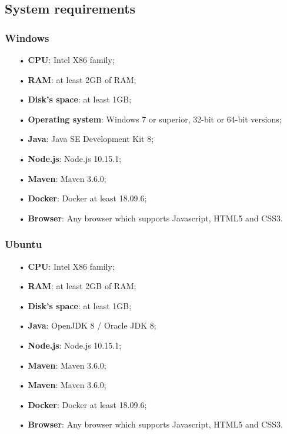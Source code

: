 \subsection{System requirements}
\subsubsection{Windows}
\begin{itemize}
\item [•]\textbf{CPU}: Intel X86 family;
\item [•]\textbf{RAM}: at least 2GB of RAM;
\item [•]\textbf{Disk's space}: at least 1GB;
\item [•]\textbf{Operating system}: Windows 7 or superior, 32-bit or 64-bit versions;
\item [•]\textbf{Java}: Java SE Development Kit 8;
\item [•]\textbf{Node.js}: Node.js 10.15.1;
\item [•]\textbf{Maven}: Maven 3.6.0;
\item [•]\textbf{Docker}: Docker at least 18.09.6;  
\item [•]\textbf{Browser}: Any browser which supports Javascript, HTML5 and CSS3.

\end{itemize}

\subsubsection{Ubuntu}
\begin{itemize}
\item [•]\textbf{CPU}: Intel X86 family;
\item [•]\textbf{RAM}: at least 2GB of RAM;
\item [•]\textbf{Disk's space}: at least 1GB;
\item [•]\textbf{Java}: OpenJDK 8 / Oracle JDK 8;
\item [•]\textbf{Node.js}: Node.js 10.15.1;
\item [•]\textbf{Maven}: Maven 3.6.0;
\item [•]\textbf{Maven}: Maven 3.6.0;
\item [•]\textbf{Docker}: Docker at least 18.09.6; 
\item [•]\textbf{Browser}: Any browser which supports Javascript, HTML5 and CSS3.
\end{itemize}

